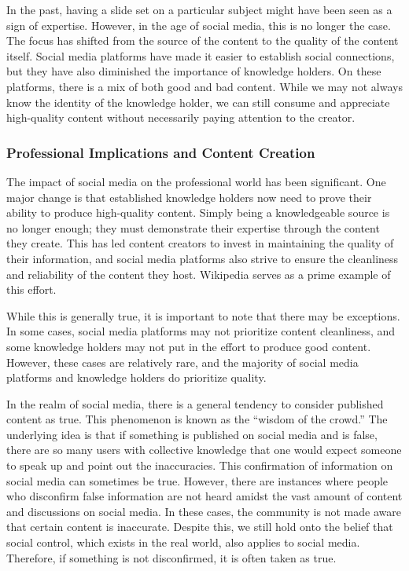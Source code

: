 In the past, having a slide set on a particular subject might have been
seen as a sign of expertise. However, in the age of social media, this
is no longer the case. The focus has shifted from the source of the
content to the quality of the content itself. Social media platforms
have made it easier to establish social connections, but they have also
diminished the importance of knowledge holders. On these platforms,
there is a mix of both good and bad content. While we may not always
know the identity of the knowledge holder, we can still consume and
appreciate high-quality content without necessarily paying attention to
the creator.

\subsubsection{Professional Implications and Content
  Creation}\label{professional-implications-and-content-creation}

The impact of social media on the professional world has been
significant. One major change is that established knowledge holders now
need to prove their ability to produce high-quality content. Simply
being a knowledgeable source is no longer enough; they must demonstrate
their expertise through the content they create. This has led content
creators to invest in maintaining the quality of their information, and
social media platforms also strive to ensure the cleanliness and
reliability of the content they host. Wikipedia serves as a prime
example of this effort.

While this is generally true, it is important to note that there may be
exceptions. In some cases, social media platforms may not prioritize
content cleanliness, and some knowledge holders may not put in the
effort to produce good content. However, these cases are relatively
rare, and the majority of social media platforms and knowledge holders
do prioritize quality.

In the realm of social media, there is a general tendency to consider
published content as true. This phenomenon is known as the ``wisdom of
the crowd.'' The underlying idea is that if something is published on
social media and is false, there are so many users with collective
knowledge that one would expect someone to speak up and point out the
inaccuracies. This confirmation of information on social media can
sometimes be true. However, there are instances where people who
disconfirm false information are not heard amidst the vast amount of
content and discussions on social media. In these cases, the community
is not made aware that certain content is inaccurate. Despite this, we
still hold onto the belief that social control, which exists in the real
world, also applies to social media. Therefore, if something is not
disconfirmed, it is often taken as true.


